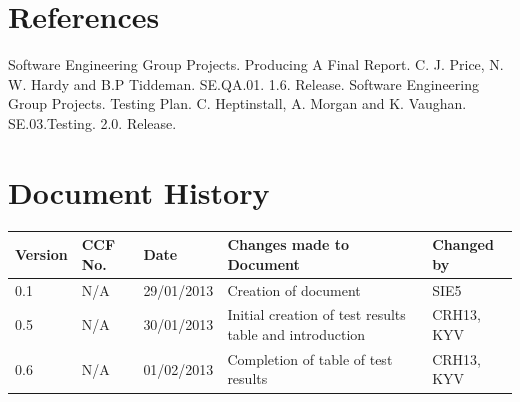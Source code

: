 \documentclass[a4paper]{article}
\begin{document}
\section{References}
\begin{thebibliography}{9}
 Software Engineering Group Projects. Producing A Final Report. C. J. Price, N. W. Hardy and B.P Tiddeman. SE.QA.01. 1.6. Release.
 Software Engineering Group Projects. Testing Plan. C. Heptinstall, A. Morgan and K. Vaughan. SE.03.Testing. 2.0. Release.
\end{thebibliography}

\section{Document History}
\begin{tabular}{|l | l | l | l | l |}
\hline
Version & CCF No. & Date & Changes made to Document & Changed by \\
\hline
0.1 & N/A & 29/01/2013 & Creation of document & SIE5\\
\hline
0.5 & N/A & 30/01/2013 & Initial creation of test results table and introduction & CRH13, KYV\\
\hline
0.6 & N/A & 01/02/2013 & Completion of table of test results & CRH13, KYV\\
\hline
\end{tabular}
\end{document}
